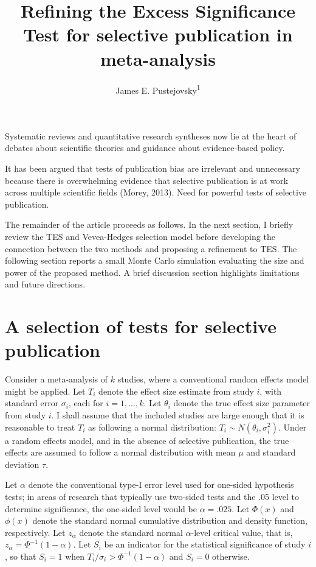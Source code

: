 \documentclass[man,floatsintext]{apa6}
\title{Refining the Excess Significance Test for selective publication in meta-analysis}
\author{James E. Pustejovsky\textsuperscript{1}}
\date{}
\affiliation{
\vspace{0.5cm}
\textsuperscript{1} University of Texas at Austin}
\begin{document}
\maketitle

Systematic reviews and quantitative research syntheses now lie at the heart of debates about scientific theories and guidance about evidence-based policy.

It has been argued that tests of publication bias are irrelevant and unnecessary because there is overwhelming evidence that selective publication is at work across multiple scientific fields (Morey, 2013).
Need for powerful tests of selective publication.

The remainder of the article proceeds as follows.
In the next section, I briefly review the TES and Vevea-Hedges selection model before developing the connection between the two methods and proposing a refinement to TES.
The following section reports a small Monte Carlo simulation evaluating the size and power of the proposed method.
A brief discussion section highlights limitations and future directions.

\hypertarget{tests}{%
\section{A selection of tests for selective publication}\label{tests}}

Consider a meta-analysis of \(k\) studies, where a conventional random effects model might be applied.
Let \(T_i\) denote the effect size estimate from study \(i\), with standard error \(\sigma_i\), each for \(i = 1,...,k\). Let \(\theta_i\) denote the true effect size parameter from study \(i\).
I shall assume that the included studies are large enough that it is reasonable to treat \(T_i\) as following a normal distribution: \(T_i \sim N(\theta_i, \sigma_i^2)\).
Under a random effects model, and in the absence of selective publication, the true effects are assumed to follow a normal distribution with mean \(\mu\) and standard deviation \(\tau\).

Let \(\alpha\) denote the conventional type-I error level used for one-sided hypothesis tests; in areas of research that typically use two-sided tests and the .05 level to determine significance, the one-sided level would be \(\alpha = .025\).
Let \(\Phi(x)\) and \(\phi(x)\) denote the standard normal cumulative distribution and density function, respectively.
Let \(z_\alpha\) denote the standard normal \(\alpha\)-level critical value, that is, \(z_\alpha = \Phi^{-1}(1 - \alpha)\).
Let \(S_i\) be an indicator for the statistical significance of study \(i\), so that \(S_i = 1\) when \(T_i / \sigma_i > \Phi^{-1}(1 - \alpha)\) and \(S_i = 0\) otherwise.
\end{document}
